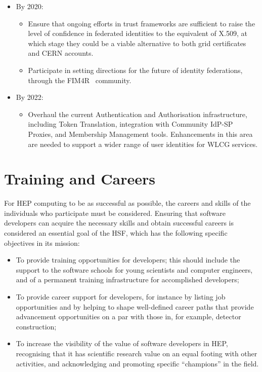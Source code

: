\documentclass[twocolumn]{svjour3}          %
\begin{document}
\begin{itemize}
\item
By 2020:
\begin{itemize}
\item
  Ensure that ongoing efforts in trust frameworks are sufficient to
  raise the level of confidence in federated identities to the
  equivalent of X.509, at which stage they could be a viable alternative
  to both grid certificates and CERN accounts.
\item
  Participate in setting directions for the future of identity
  federations, through the FIM4R~\cite{FIM4R} community.
\end{itemize}
\item
By 2022:
\begin{itemize}
\item
  Overhaul the current Authentication and Authorisation infrastructure,
  including Token Translation, integration with Community IdP-SP
  Proxies, and Membership Management tools. Enhancements in this area
  are needed to support a wider range of user identities for WLCG
  services.
\end{itemize}
\end{itemize}

\hypertarget{training-and-careers}{%
\section{Training and Careers}\label{training-and-careers}}

For HEP computing to be as successful as possible, the careers and
skills of the individuals who participate must be considered. Ensuring
that software developers can acquire the necessary skills and obtain
successful careers is considered an essential goal of the HSF, which has
the following specific objectives in its mission:

\begin{itemize}
\item
  To provide training opportunities for developers; this should include
  the support to the software schools for young scientists and computer
  engineers, and of a permanent training infrastructure for accomplished
  developers;
\item
  To provide career support for developers, for instance by listing job
  opportunities and by helping to shape well-defined career paths that
  provide advancement opportunities on a par with those in, for example,
  detector construction;
\item
  To increase the visibility of the value of software developers in HEP,
  recognising that it has scientific research value on an equal footing
  with other activities, and acknowledging and promoting specific
  ``champions'' in the field.
\end{itemize}
\end{document}
